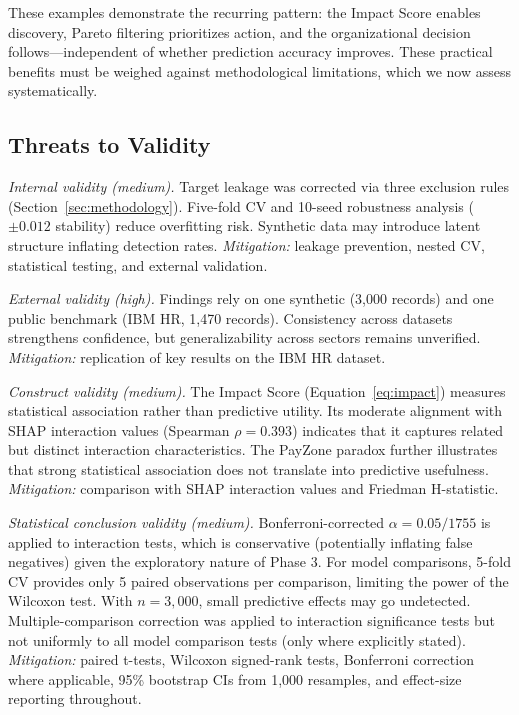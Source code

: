 \documentclass[conference]{IEEEtran}
\begin{document}
These examples demonstrate the recurring pattern: the Impact Score enables discovery, Pareto filtering prioritizes action, and the organizational decision follows---independent of whether prediction accuracy improves. These practical benefits must be weighed against methodological limitations, which we now assess systematically.

\subsection{Threats to Validity}
\label{sec:threats}

\textit{Internal validity (medium).} Target leakage was corrected via three exclusion rules (Section~\ref{sec:methodology}). Five-fold CV and 10-seed robustness analysis ($\pm0.012$ stability) reduce overfitting risk. Synthetic data may introduce latent structure inflating detection rates. \textit{Mitigation:} leakage prevention, nested CV, statistical testing, and external validation.

\textit{External validity (high).} Findings rely on one synthetic (3,000 records) and one public benchmark (IBM HR, 1,470 records). Consistency across datasets strengthens confidence, but generalizability across sectors remains unverified. \textit{Mitigation:} replication of key results on the IBM HR dataset.

\textit{Construct validity (medium).} The Impact Score (Equation~\ref{eq:impact}) measures statistical association rather than predictive utility. Its moderate alignment with SHAP interaction values (Spearman $\rho=0.393$) indicates that it captures related but distinct interaction characteristics. The PayZone paradox further illustrates that strong statistical association does not translate into predictive usefulness. \textit{Mitigation:} comparison with SHAP interaction values and Friedman H-statistic.

\textit{Statistical conclusion validity (medium).} Bonferroni-corrected $\alpha = 0.05/1755$ is applied to interaction tests, which is conservative (potentially inflating false negatives) given the exploratory nature of Phase 3. For model comparisons, 5-fold CV provides only 5 paired observations per comparison, limiting the power of the Wilcoxon test. With $n=3{,}000$, small predictive effects may go undetected. Multiple-comparison correction was applied to interaction significance tests but not uniformly to all model comparison tests (only where explicitly stated). \textit{Mitigation:} paired t-tests, Wilcoxon signed-rank tests, Bonferroni correction where applicable, 95\% bootstrap CIs from 1,000 resamples, and effect-size reporting throughout.
\end{document}
